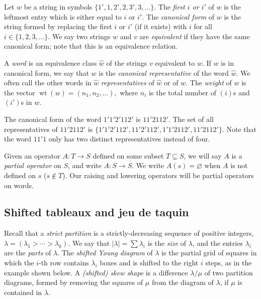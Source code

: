 \documentclass[ALCO,ThmDefs,Unicode,epreuves]{cedram}
\DeclareMathOperator{\wt}{wt}
\begin{document}
\begin{defi}
Let $w$ be a string in symbols $\{1',1,2',2,3',3,\ldots\}$. The \emph{first $i$ or $i'$} of $w$ is the leftmost entry which is either equal to $i$ or $i'$. The \emph{canonical form} of $w$ is the string formed by replacing the first $i$ or $i'$ (if it exists) with $i$ for all $i\in \{1,2,3,\ldots\}$. We say two strings $w$ and $v$ are \emph{equivalent} if they have the same canonical form; note that this is an equivalence relation.
\end{defi}

\begin{defi}
A \emph{word} is an equivalence class $\hat{w}$ of the strings $v$ equivalent to $w$. If $w$ is in canonical form, we say that $w$ is the \emph{canonical representative} of the word $\hat{w}$. We often call the other words in $\hat{w}$ \emph{representatives} of $\hat{w}$ or of $w$. The \emph{weight} of $w$ is the vector $\wt (w) = (n_1, n_2, \ldots ),$ where $n_i$ is the total number of $(i)$s and $(i')$s in $w$.
\end{defi}

\begin{exam}
The canonical form of the word $1'1'2'112'$ is $11'2112'$. The set of all representatives of $11'2112'$ is $\{1'1'2'112',11'2'112',1'1'2112',11'2112'\}$. Note that the word $11'1$ only has two distinct representatives instead of four.
\end{exam}

Given an operator $A:T\to S$ defined on some subset $T\subseteq S$, we will say $A$ is a \emph{partial operator} on $S$, and write $A : S \to S$. We write $A(s)=\varnothing$ when $A$ is not defined on $s$ (\ie $s\not\in T$). Our raising and lowering operators will be partial operators on words.

\subsection{Shifted tableaux and jeu de taquin}

Recall that a \emph{strict partition} is a strictly-decreasing sequence of positive integers, $\lambda=(\lambda_1 > \cdots > \lambda_k)$. We say that $|\lambda|=\sum \lambda_i$ is the \emph{size} of $\lambda$, and the entries $\lambda_i$ are the \emph{parts} of $\lambda$. The \emph{shifted Young diagram} of $\lambda$ is the partial grid of squares in which the $i$-th row contains $\lambda_i$ boxes and is shifted to the right $i$ steps, as in the example shown below. A \emph{(shifted) skew shape} is a difference $\lambda/\mu$ of two partition diagrams, formed by removing the squares of $\mu$ from the diagram of $\lambda$, if $\mu$ is contained in $\lambda$. 
\end{document}
